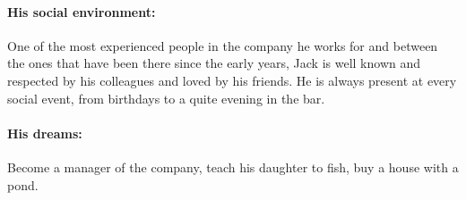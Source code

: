 \paragraph*{His social environment:}
One of the most experienced people in the company he works for and between the ones that have been there since the early years, Jack is well known and respected by his colleagues and loved by his friends. He is always present at every social event, from birthdays to a quite evening in the bar. 
\paragraph*{His dreams:}
Become a manager of the company, teach his daughter to fish, buy a house with a pond.
